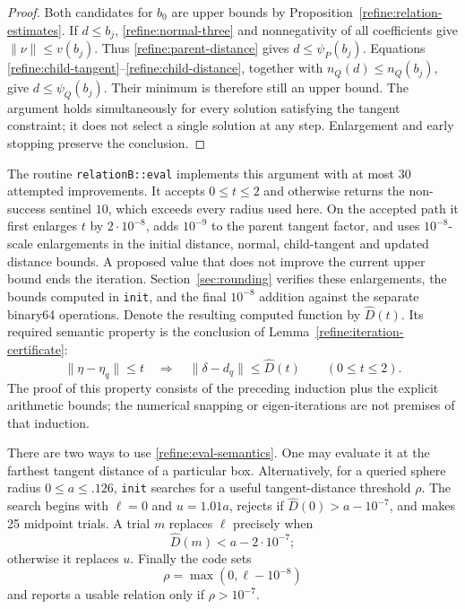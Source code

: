 \begin{proof}
Both candidates for $b_0$ are upper bounds by
Proposition~\ref{refine:relation-estimates}.  If $d\leq b_j$,
\eqref{refine:normal-three} and nonnegativity of all coefficients give
$\|\nu\|\leq v(b_j)$.  Thus \eqref{refine:parent-distance} gives
$d\leq\psi_P(b_j)$.  Equations
\eqref{refine:child-tangent}--\eqref{refine:child-distance}, together
with $n_Q(d)\leq n_Q(b_j)$, give $d\leq\psi_Q(b_j)$.
Their minimum is therefore still an upper bound.  The argument holds
simultaneously for every solution satisfying the tangent constraint;
it does not select a single solution at any step.  Enlargement and
early stopping preserve the conclusion.
\end{proof}

The routine \texttt{relationB::eval} implements this argument with at
most 30 attempted improvements.  It accepts $0\leq t\leq2$ and otherwise
returns the non-success sentinel $10$, which exceeds every radius used
here.  On the accepted path it first enlarges $t$ by $2\cdot10^{-8}$,
adds $10^{-9}$ to the parent tangent factor, and uses $10^{-8}$-scale
enlargements in the initial distance, normal, child-tangent and updated
distance bounds.  A proposed value that does not improve the current
upper bound ends the iteration.  Section~\ref{sec:rounding} verifies
these enlargements, the bounds computed in \texttt{init}, and the final
$10^{-8}$ addition against the separate binary64 operations.  Denote
the resulting computed function by $\widehat D(t)$.  Its required
semantic property is the conclusion of
Lemma~\ref{refine:iteration-certificate}:
\begin{equation}\label{refine:eval-semantics}
 \|\eta-\eta_q\|\leq t
 \quad\Longrightarrow\quad
 \|\delta-d_q\|\leq\widehat D(t)
 \qquad(0\leq t\leq2).
\end{equation}
The proof of this property consists of the preceding induction plus
the explicit arithmetic bounds; the numerical snapping or
eigen-iterations are not premises of that induction.

There are two ways to use \eqref{refine:eval-semantics}.  One may
evaluate it at the farthest tangent distance of a particular box.
Alternatively, for a queried sphere radius $0\leq a\leq .126$, \texttt{init} searches
for a useful tangent-distance threshold $\rho$.  The search begins
with $\ell=0$ and $u=1.01a$, rejects if
$\widehat D(0)>a-10^{-7}$, and makes 25 midpoint trials.  A trial $m$
replaces $\ell$ precisely when
\begin{equation}\label{refine:rho-trial}
 \widehat D(m)<a-2\cdot10^{-7};
\end{equation}
otherwise it replaces $u$.  Finally the code sets
\begin{equation}\label{refine:rho-return}
 \rho=\max(0,\ell-10^{-8})
\end{equation}
and reports a usable relation only if $\rho>10^{-7}$.

